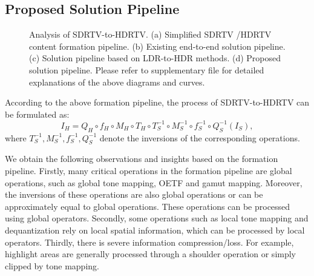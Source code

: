 \documentclass[10pt,twocolumn,letterpaper]{article}
\begin{document}
\subsection{Proposed Solution Pipeline}
\begin{figure}[!t]
\centering

\caption{Analysis of SDRTV-to-HDRTV. (a) Simplified SDRTV
 /HDRTV content formation pipeline. (b) Existing end-to-end solution pipeline. (c) Solution pipeline based on LDR-to-HDR methods. (d) Proposed solution pipeline. Please refer to supplementary file for detailed explanations of the above diagrams and curves.}
\label{Figure 1 image pipeline}
\vspace{-7pt}
\end{figure}

According to the above formation pipeline, the process of SDRTV-to-HDRTV can be formulated as:
\begin{equation}
   I_{H}=Q_{H}\circ f_{H}\circ M_{H}\circ T_{H} \circ T_{S}^{-1}\circ M_{S}^{-1}\circ f_{S}^{-1}\circ Q_{S}^{-1}(I_{S}),
\end{equation} 
where $T_{S}^{-1}, M_{S}^{-1}, f_{S}^{-1}, Q_{S}^{-1}$ denote the inversions of the corresponding operations. 

We obtain the following observations and insights based on the formation pipeline. Firstly, many critical operations in the formation pipeline are global operations, such as global tone mapping, OETF and gamut mapping. Moreover, the inversions of these operations are also global operations or can be approximately equal to global operations. These operations can be processed using global operators. Secondly, some operations such as local tone mapping and dequantization rely on local spatial information, which can be processed by local operators. Thirdly, there is severe information compression/loss. For example, highlight areas are generally processed through a shoulder operation or simply clipped by tone mapping. 
\end{document}
